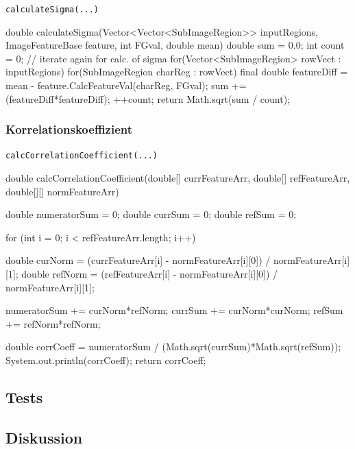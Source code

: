 \documentclass[german,notitlepage,smartquotes]{hgbreport}
\begin{document}
\begin{program}
\caption{\texttt{calculateSigma(...)}}
\label{prog:calc-sigma}
\begin{JavaCode}
double calculateSigma(Vector<Vector<SubImageRegion>> inputRegions, ImageFeatureBase feature, int FGval, double mean) {
	double sum = 0.0;
	int count = 0;
	// iterate again for calc. of sigma
	for(Vector<SubImageRegion> rowVect : inputRegions) {
		for(SubImageRegion charReg : rowVect) {
			final double featureDiff = mean - feature.CalcFeatureVal(charReg, FGval);
			sum += (featureDiff*featureDiff);
			++count;
		}
	}
	return Math.sqrt(sum / count);
}
\end{JavaCode}
\end{program}

\subsubsection{Korrelationskoeffizient}

\begin{program}
\caption{\texttt{calcCorrelationCoefficient(...)}}
\label{prog:calc-corr-coeff}
\begin{JavaCode}
double calcCorrelationCoefficient(double[] currFeatureArr, double[] refFeatureArr, double[][] normFeatureArr) {
	double numeratorSum = 0;
	double currSum = 0;
	double refSum = 0;

	for (int i = 0; i < refFeatureArr.length; i++) {
		double curNorm = (currFeatureArr[i] - normFeatureArr[i][0]) / normFeatureArr[i][1];
		double refNorm = (refFeatureArr[i] - normFeatureArr[i][0]) / normFeatureArr[i][1];

		numeratorSum += curNorm*refNorm;
		currSum += curNorm*curNorm;
		refSum += refNorm*refNorm;
	}
	double corrCoeff = numeratorSum / (Math.sqrt(currSum)*Math.sqrt(refSum));
	System.out.println(corrCoeff);
	return corrCoeff;
}
\end{JavaCode}
\end{program}


\subsection{Tests}

\subsection{Diskussion}

\end{document}
